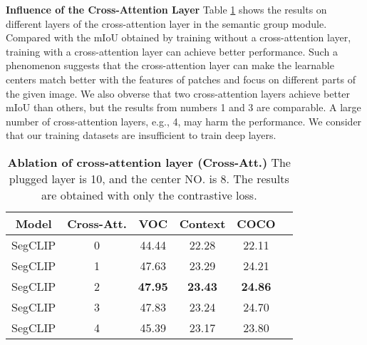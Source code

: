 \documentclass{article}
\theoremstyle{plain}
\theoremstyle{definition}
\theoremstyle{remark}
\begin{document}
\vspace{0.1cm}
\noindent
\textbf{Influence of the Cross-Attention Layer} \quad
Table \ref{tab:result_of_group_layer} shows the results on different layers of the cross-attention layer in the semantic group module. Compared with the mIoU obtained by training without a cross-attention layer, training with a cross-attention layer can achieve better performance. Such a phenomenon suggests that the cross-attention layer can make the learnable centers match better with the features of patches and focus on different parts of the given image. We also obverse that two cross-attention layers achieve better mIoU than others, but the results from numbers 1 and 3 are comparable. A large number of cross-attention layers, e.g., 4, may harm the performance. We consider that our training datasets are insufficient to train deep layers.
\begin{table}[tp]
    \setlength{\tabcolsep}{6pt}
    \centering
    \begin{tabular}{cccccc}
        \toprule
        Model     & Cross-Att. & VOC & Context & COCO \\ \midrule
        SegCLIP     & 0 & 44.44 & 22.28 & 22.11 \\
        SegCLIP     & 1 & 47.63 & 23.29 & 24.21 \\
        SegCLIP     & 2 & \textbf{47.95} & \textbf{23.43} & \textbf{24.86} \\
        SegCLIP     & 3 & 47.83 & 23.24 & 24.70 \\
        SegCLIP     & 4 & 45.39 & 23.17 & 23.80 \\
        \bottomrule
    \end{tabular}
    \caption{\textbf{Ablation of cross-attention layer (Cross-Att.)} The plugged layer is 10, and the center NO. is 8. The results are obtained with only the contrastive loss.}
    \label{tab:result_of_group_layer}
\end{table}
\end{document}
